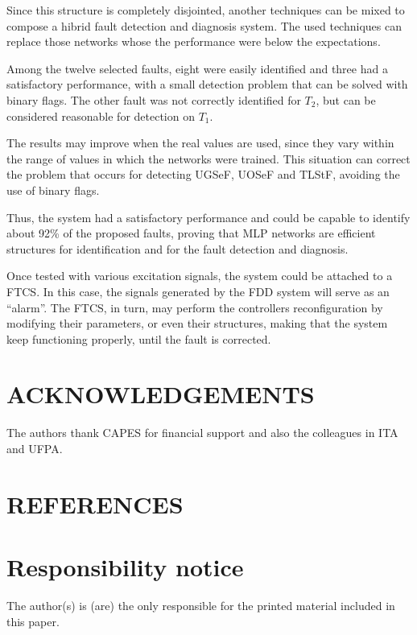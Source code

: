 \documentclass[10pt,fleqn,a4paper]{article}
\begin{document}
Since this structure is completely disjointed, another techniques can be mixed
to compose a hibrid fault detection and diagnosis system. The used techniques
can replace those networks whose the performance were below the expectations.

Among the twelve selected faults, eight were easily identified and three had a
satisfactory performance, with a small detection problem that can be solved
with binary flags. The other fault was not correctly identified for $T_2$,
but can be considered reasonable for detection on $T_1$.

The results may improve when the real values are used, since they vary within
the range of values in which the networks were trained. This situation can
correct the problem that occurs for detecting UGSeF, UOSeF and TLStF, avoiding
the use of binary flags.

Thus, the system had a satisfactory performance and could be capable to identify
about 92\% of the proposed faults, proving that MLP networks are efficient
structures for identification and for the fault detection and diagnosis.

Once tested with various excitation signals, the system could be attached to a
FTCS. In this case, the signals generated by the FDD system will serve as an
``alarm''. The FTCS, in turn, may perform the controllers reconfiguration by
modifying their parameters, or even their structures, making that the system
keep functioning properly, until the fault is corrected.

\section{ACKNOWLEDGEMENTS}
The authors thank CAPES for financial support and also the colleagues in ITA and
UFPA.

\section{REFERENCES}


\renewcommand{\refname}{}


\section{Responsibility notice}
The author(s) is (are) the only responsible for the printed material included in
this paper.
\end{document}
